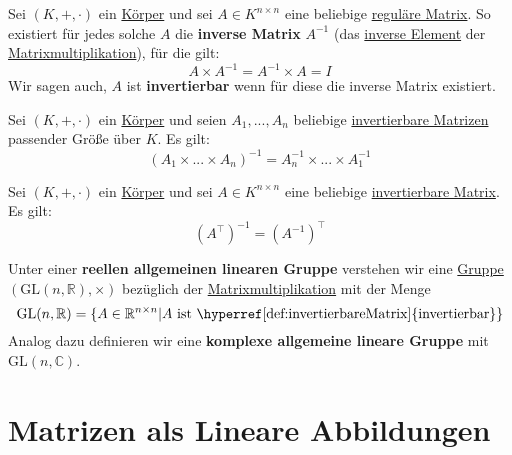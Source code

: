 \documentclass[../../main.tex]{subfiles}
\begin{document}
	\begin{definition}
		\label{def:InverseMatrix}
		\label{def:invertierbareMatrix}
		Sei $(K,+,\cdot)$ ein \hyperref[def:Körper]{Körper} und sei $A\in K^{n \times n}$ eine beliebige \hyperref[def:reguläreMatrix]{reguläre Matrix}. So existiert für jedes solche $A$ die \textbf{inverse Matrix} $A^{-1}$ (das \hyperref[def:inversesElement]{inverse Element} der \hyperref[def:Matrixmultiplikation]{Matrixmultiplikation}), für die gilt: $$A \times A^{-1} = A^{-1} \times A = I$$
		Wir sagen auch, $A$ ist \textbf{invertierbar} wenn für diese die inverse Matrix existiert. 
	\end{definition}

	\begin{theorem}
		Sei $(K,+,\cdot)$ ein \hyperref[def:Körper]{Körper} und seien $A_1, ..., A_n$ beliebige \hyperref[def:invertierbareMatrix]{invertierbare Matrizen} passender Größe über $K$. Es gilt: $$(A_1 \times ... \times A_n)^{-1} = A_n^{-1} \times ... \times A_1^{-1}$$
	\end{theorem}

	\begin{theorem}
		Sei $(K,+,\cdot)$ ein \hyperref[def:Körper]{Körper} und sei $A \in K^{n \times n}$ eine beliebige \hyperref[def:invertierbareMatrix]{invertierbare Matrix}. Es gilt: $$(A^\top)^{-1} = (A^{-1})^\top$$
	\end{theorem}

	\begin{definition}
		Unter einer \textbf{reellen allgemeinen linearen Gruppe} verstehen wir eine \hyperref[def:Gruppe]{Gruppe} $(\textrm{GL}(n,\mathbb{R}),\times)$ bezüglich der \hyperref[def:Matrixmultiplikation]{Matrixmultiplikation} mit der Menge $$\textrm{GL}(n,\mathbb{R}) = \{A \in \mathbb{R}^{n\times n} | A \textrm{ ist \hyperref[def:invertierbareMatrix]{invertierbar}} \}$$
		Analog dazu definieren wir eine \textbf{komplexe allgemeine lineare Gruppe} mit $\textrm{GL}(n, \mathbb{C})$. 
	\end{definition}

	\newpage
	\section{Matrizen als Lineare Abbildungen}
	
\end{document}
